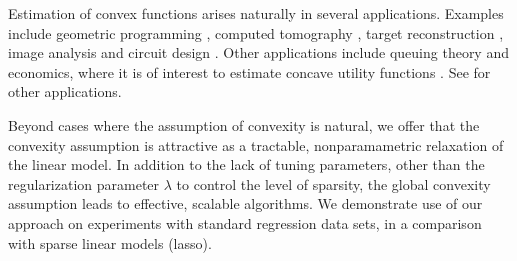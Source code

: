 Estimation of convex functions arises naturally in several
applications.  Examples include geometric programming \cite{Boyd04},
computed tomography \cite{Prince:90}, target reconstruction
\cite{Lele:92}, image analysis \cite{Golden:06} and circuit design
\cite{Hannah:12}.  Other applications include queuing theory
\cite{Chen:01} and economics, where it is of interest to estimate
concave utility functions \cite{Pratt:68}.  See \cite{Lim:12} for
other applications.  

Beyond cases where the assumption of convexity is
natural, we offer that the convexity assumption is attractive as a
tractable, nonparamametric relaxation of the linear model.  In
addition to the lack of tuning parameters, other than the
regularization parameter $\lambda$ to control the level of sparsity,
the global convexity assumption leads to effective, scalable algorithms.  We
demonstrate use of our approach on experiments with standard
regression data sets, in a comparison with sparse linear models
(lasso).


\def\mathbf#1{\mbox{\boldmath $#1$}} 




